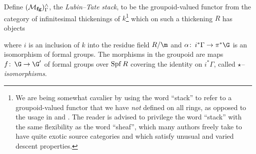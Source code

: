 \begin{definition}\label{LubinTateDefn}
Define \((\mathcal{M}_{\mathbf{fg}})^\wedge_\Gamma\), the \textit{Lubin--Tate stack}, to be the groupoid-valued functor from the category of infinitesimal thickenings of \(k\)\footnote{We are being somewhat cavalier by using the word ``stack'' to refer to a groupoid-valued functor that we have \emph{not} defined on all rings, as opposed to the usage in  and .  The reader is advised to privilege the word ``stack'' with the same flexibility as the word ``sheaf'', which many authors freely take to have quite exotic source categories and which satisfy unusual and varied descent properties.} which on such a thickening \(R\) has objects
\begin{center}
\end{center}
where \(i\) is an inclusion of \(k\) into the residue field \(R/\m\) and \(\alpha\co i^* \Gamma \to \pi^* \G\) is an isomorphism of formal groups.  The morphisms in the groupoid are maps \(f\co \G \to \G'\) of formal groups over \(\operatorname{Spf} R\) covering the identity on \(i^* \Gamma\), called \textit{\(\star\)--isomorphisms}.
\end{definition}


